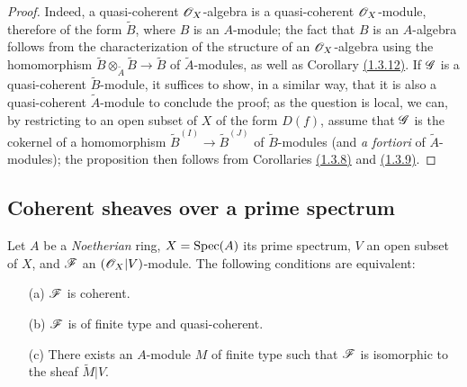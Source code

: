 \begin{proof}
\label{proof-cor-1.1.4.3}
Indeed, a quasi-coherent $\mathscr{O}_X$-algebra is a quasi-coherent $\mathscr{O}_X$-module, therefore of the
form $\widetilde{B}$, where $B$ is an $A$-module; the fact that $B$ is an $A$-algebra
follows from the characterization of the structure of an $\mathscr{O}_X$-algebra using the
homomorphism $\widetilde{B}\otimes_{\widetilde{A}}\widetilde{B}\to\widetilde{B}$ of
$\widetilde{A}$-modules, as well as Corollary \hyperref[cor-1.1.3.12]{(1.3.12)}. If $\mathscr{G}$ is a quasi-coherent
$\widetilde{B}$-module, it suffices to show, in a similar way,
that it is also a quasi-coherent $\widetilde{A}$-module to conclude the proof; as the
question is local, we can, by restricting to an open subset of $X$ of the form $D(f)$, assume
that $\mathscr{G}$ is the cokernel of a homomorphism $\widetilde{B}^{(I)}\to\widetilde{B}^{(J)}$
of $\widetilde{B}$-modules (and {\it a fortiori} of $\widetilde{A}$-modules); the
proposition then follows from Corollaries \hyperref[cor-1.1.3.8]{(1.3.8)} and \hyperref[cor-1.1.3.9]{(1.3.9)}.
\end{proof}

\subsection{Coherent sheaves over a prime spectrum}
\label{subsection-coh-over-spec}

\begin{thm}[1.5.1]
\label{thm-1.1.5.1}
Let $A$ be a {\it Noetherian} ring, $X={\mathop{\mathrm{Spec}}\nolimits}(A)$ its prime spectrum, $V$ an open subset of
$X$, and $\mathscr{F}$ an $(\mathscr{O}_X|V)$-module. The following conditions are equivalent:
\begin{itemize}
  \item[{\rm(a)}] $\mathscr{F}$ is coherent.
  \item[{\rm(b)}] $\mathscr{F}$ is of finite type and quasi-coherent.
  \item[{\rm(c)}] There exists an $A$-module $M$ of finite type such that $\mathscr{F}$ is isomorphic to
        the sheaf $\widetilde{M}|V$.
\end{itemize}
\end{thm}

